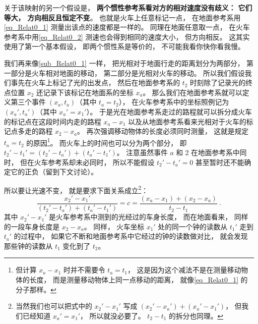 关于该映射的另一个假设是， \textbf{两个惯性参考系看对方的相对速度没有歧义： 它们等大， 方向相反且恒定不变}。 也就是火车上任意标记一点， 在地面参考系用\autoref{eq_Relat0_1} 测量出该点的速度都是一样的。 同理在地面任意取一点， 在火车参考系中用\autoref{eq_Relat0_2} 测速也会得到相同的速度大小， 但方向相反。 这其实使用了第一个基本假设， 即两个惯性系是等价的， 不可能我看你快你看我慢。

我们再来像\autoref{sub_Relat0_1} 一样， 把光相对于地面行走的距离划分为两部分， 第一部分是火车相对地面的移动， 第二部分是光相对火车的移动。 所以我们假设我们事先在火车上标记了光的出发点， 然后在地面参考系的 $t_2$ 时刻除了记录光的终点位置 $x_2$ 还记录下该标记在地面系的坐标 $x_a$。 那么我们在地面参考系就可以定义第三个事件 $(x_a, t_a)$（其中 $t_a = t_2$）， 在火车参考系中的坐标照例记为 $(x_a', t_a')$（其中 $x_a' = x_1'$）。 于是光在地面参考系走过的路程就可以拆分成火车的标记点在这段时间内走的路程 $x_a - x_1$ 以及从地面参考系看来光相对于火车的标记点多走的路程 $x_2 - x_a$。 再次强调移动物体的长度必须同时测量， 这就是规定 $t_a = t_2$ 的原因\footnote{但计算 $x_a-x_1$ 时并不需要令 $t_a = t_1$， 这是因为这个减法不是在测量移动物体的长度， 而是测量移动物体上同一点移动的距离， 就像\autoref{eq_Relat0_1} 的分子那样。}。 而火车上的时间也可以分为两个部分， 即 $t_2' - t_1' = (t_2' - t_a') + (t_a' - t_1')$。 注意虽然事件 $a$ 和 2 在地面参考系中同时， 但在火车参考系却未必同时， 所以不能假设 $t_2' - t_a' = 0$ 甚至暂时还不能确定它的正负（留到下文讨论）。

所以要让光速不变， 就是要求下面关系成立\footnote{当然我们也可以把式中的 $x_2' - x_1'$ 写成 $(x_2'-x_a') + (x_a'-x_1')$， 但我们已经知道 $x_a'=x_1'$， 所以就没必要了。 $t_2-t_1$ 的拆分也同理。}：
\begin{equation} \label{eq_Relat0_3}
\frac{x_2' - x_1'}{(t_2' - t_a') + (t_a' - t_1')} = c = \frac{(x_a - x_1) + (x_2 - x_a)}{t_2 - t_1}~.
\end{equation}
其中 $x_2' - x_1'$ 是火车参考系中测到的光经过的车身长度， 而在地面看来， 同样的一段车身长度是 $x_2 - x_a$。 同样， 火车坐标 $x_1'$ 处的同一个钟的读数从 $t_1'$ 走到 $t_a'$ 的过程中， 如果它不断和地面参考系中它经过的钟的读数做对比， 就会发现那些钟的读数从 $t_1$ 变化到了 $t_2$。

